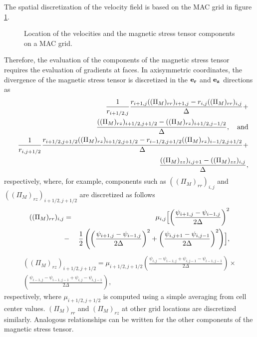 The spatial discretization of the velocity field is based on the
MAC grid in figure \ref{fig:figure22}.
\begin{figure}
\begin{center}
\end{center}
 \caption{Location of the velocities and the magnetic
stress tensor components on a
MAC grid.} \label{fig:figure22}
\end{figure}
Therefore, the evaluation of the components of the magnetic stress tensor requires the evaluation
of gradients at faces. In axisymmetric coordinates,
the divergence of the magnetic stress tensor is discretized in the ${\bf e_r}$ and ${\bf e_z}$
directions as
\begin{eqnarray}
& & \frac{1}{r_{i+1/2,j}} \frac{r_{i+1,j}(({\Pi}_M)_{rr})_{i+1,j}
-r_{i,j}(({ \Pi}_M)_{rr})_{i,j}}{\Delta} + \nonumber\\
& &
\frac{(({\Pi}_M)_{rz})_{i+1/2,j+1/2}-(({ \Pi}_M)_{rz})_{i+1/2,j-1/2}}
{\Delta},\quad {\rm and} \nonumber\\
& & \frac{1}{r_{i,j+1/2}}
\frac{r_{i+1/2,j+1/2}(({ \Pi}_M)_{rz})_{i+1/2,j+1/2}
-r_{i-1/2,j+1/2}(({\Pi}_M)_{rz})_{i-1/2,j+1/2}}{\Delta} + \nonumber\\
& &
\frac{(({\Pi}_M)_{zz})_{i,j+1}-(({ \Pi}_M)_{zz})_{i,j}}{\Delta},
\end{eqnarray}
respectively, where, for example, components such as $(({\Pi}_M)_{rr})_{i,j}$ and
$(({ \Pi}_M)_{rz})_{i+1/2,j+1/2}$ are discretized as follows
\begin{eqnarray}
(({\Pi}_M)_{rr})_{i,j} &=& \mu_{i,j} \Bigl[\left(\frac{\psi_{i+1,j} - \psi_{i-1,j}}{2\Delta}\right)^2 \nonumber\\
&-& \frac{1}{2}\left(\left(\frac{\psi_{i+1,j} - \psi_{i-1,j}}{2\Delta}\right)^2 + \left(\frac{\psi_{i,j+1} -
\psi_{i,j-1}}{2\Delta}\right)^2\right) \Bigr], \nonumber
\end{eqnarray}
\begin{eqnarray}
(({\Pi}_M)_{rz})_{i+1/2,j+1/2} = \mu_{i+1/2,j+1/2}
\left(\frac{\psi_{i,j} - \psi_{i-1,j} + \psi_{i,j-1} - \psi_{i-1,j-1}}{2\Delta}\right)
\times \nonumber \\
\left(\frac{\psi_{i-1,j} - \psi_{i-1,j-1} + \psi_{i,j} - \psi_{i,j-1}}{2\Delta}\right),
\end{eqnarray}
respectively, where $\mu_{i+1/2,j+1/2}$ is computed using a simple averaging from cell
center values. $({\Pi}_M)_{rr}$ and $({ \Pi}_M)_{rz}$ at other grid locations
are discretized similarly. Analogous relationships can be written for the other components
of the magnetic stress tensor. 

